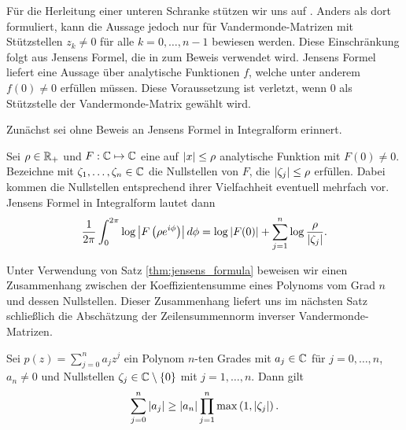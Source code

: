 \noindent Für die Herleitung einer unteren Schranke stützen wir uns auf \cite{gautschi2}.
Anders als dort formuliert, kann die Aussage jedoch nur für
Vandermonde-Matrizen mit Stützstellen $z_k \neq 0$ für alle $k = 0, \dots, n-1$
bewiesen werden.
Diese Einschränkung folgt aus Jensens Formel, die in \cite{gautschi2} zum
Beweis verwendet wird.
Jensens Formel liefert eine Aussage über analytische Funktionen $f$, welche unter
anderem $f(0) \neq 0$ erfüllen müssen.
Diese Voraussetzung ist verletzt, wenn $0$ als Stützstelle der
Vandermonde-Matrix gewählt wird.

Zunächst sei ohne Beweis an Jensens Formel in Integralform erinnert.
\begin{theorem}
    \label{thm:jensens_formula}
    Sei $\rho \in \mathbb{R}_+$ und $F: \mathbb{C} \mapsto \mathbb{C}$ eine auf $\left\lvert x \right\rvert \leq \rho$
    analytische Funktion mit $F(0) \neq 0$.
    Bezeichne mit $\zeta_1, \dots, \zeta_n \in \mathbb{C}$ die Nullstellen von $F$, die
    $\left\lvert \zeta_j \right\rvert \leq \rho$ erfüllen.
    Dabei kommen die Nullstellen entsprechend ihrer Vielfachheit eventuell mehrfach
    vor.
    Jensens Formel in Integralform lautet dann
    \begin{equation}
        \frac{1}{2\pi} \int_{0}^{2 \pi} \log \left\lvert F\left( \rho e^{i\phi} \right) \right\rvert d\phi
        = \log \left\lvert F(0) \right\rvert + \sum_{j=1}^{n} \log \frac{\rho}{\left\lvert \zeta_j \right\rvert}.
    \end{equation}
\end{theorem}

\noindent Unter Verwendung von Satz \ref{thm:jensens_formula} beweisen
wir einen Zusammenhang zwischen der Koeffizientensumme eines Polynoms vom Grad
$n$ und dessen Nullstellen.
Dieser Zusammenhang liefert uns im nächsten Satz schließlich die Abschätzung
der Zeilensummennorm inverser Vandermonde-Matrizen.
\begin{lemma}
    \label{lemma:polynom_coefficient_sum_inequality}
    Sei $p(z) = \sum_{j = 0}^{n} a_j z^j$ ein Polynom $n$-ten Grades mit
    $a_j \in \mathbb{C}$ für $j = 0, \dots, n$, $a_n \neq 0$ und Nullstellen
    $\zeta_j \in \mathbb{C}\setminus\{0\}$ mit $j = 1, \dots, n$.
    Dann gilt
    \begin{equation}
        \label{eq:polynom_coefficient_sum_inequality}
        \sum_{j=0}^{n} \left\lvert a_j \right\rvert \geq \left\lvert a_n \right\rvert \prod_{j=1}^{n} \max \left(1, \left\lvert \zeta_j \right\rvert \right).
    \end{equation}
\end{lemma}

